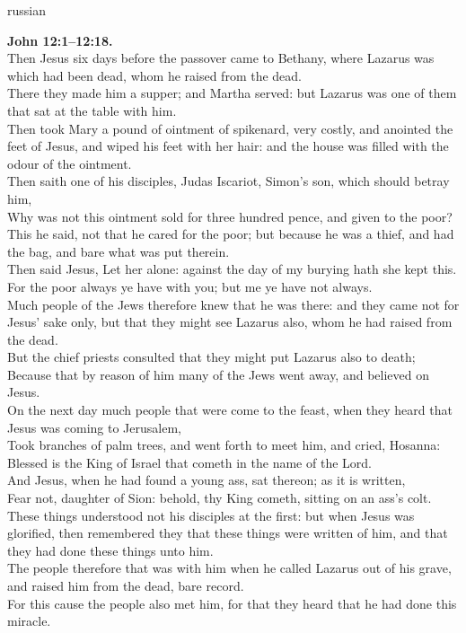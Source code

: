 \documentclass[10pt]{article} %
\begin{document}
{\begin{minipage}[t]{0.5\textwidth}
\begin{otherlanguage*}{russian}
\end{otherlanguage*}
\end{minipage}
\hfill
\begin{minipage}[t]{0.45\textwidth}

\textbf{John 12:1--12:18.}\\
Then Jesus six days before the passover came to Bethany, where Lazarus was which had been dead, whom he raised from the dead.\\
There they made him a supper; and Martha served: but Lazarus was one of them that sat at the table with him.\\
Then took Mary a pound of ointment of spikenard, very costly, and anointed the feet of Jesus, and wiped his feet with her hair: and the house was filled with the odour of the ointment.\\
Then saith one of his disciples, Judas Iscariot, Simon's son, which should betray him,\\
Why was not this ointment sold for three hundred pence, and given to the poor?\\
This he said, not that he cared for the poor; but because he was a thief, and had the bag, and bare what was put therein.\\
Then said Jesus, Let her alone: against the day of my burying hath she kept this.\\
For the poor always ye have with you; but me ye have not always.\\
Much people of the Jews therefore knew that he was there: and they came not for Jesus' sake only, but that they might see Lazarus also, whom he had raised from the dead.\\
But the chief priests consulted that they might put Lazarus also to death;\\
Because that by reason of him many of the Jews went away, and believed on Jesus.\\
On the next day much people that were come to the feast, when they heard that Jesus was coming to Jerusalem,\\
Took branches of palm trees, and went forth to meet him, and cried, Hosanna: Blessed is the King of Israel that cometh in the name of the Lord.\\
And Jesus, when he had found a young ass, sat thereon; as it is written,\\
Fear not, daughter of Sion: behold, thy King cometh, sitting on an ass's colt.\\
These things understood not his disciples at the first: but when Jesus was glorified, then remembered they that these things were written of him, and that they had done these things unto him.\\
The people therefore that was with him when he called Lazarus out of his grave, and raised him from the dead, bare record.\\
For this cause the people also met him, for that they heard that he had done this miracle.\\

\end{minipage}}
\end{document}
